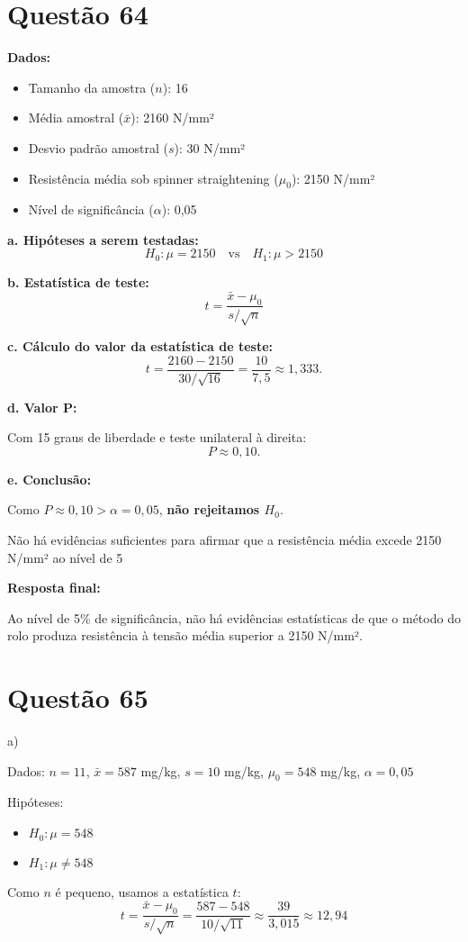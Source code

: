 \documentclass[12pt]{article}
\newcommand{\quest}[1]{\section*{Questão #1}} %
\begin{document}
\quest{64}

\textbf{Dados:}

\begin{itemize}
    \item Tamanho da amostra (\(n\)): 16
    \item Média amostral (\(\bar{x}\)): 2160 N/mm²
    \item Desvio padrão amostral (\(s\)): 30 N/mm²
    \item Resistência média sob spinner straightening (\(\mu_0\)): 2150 N/mm²
    \item Nível de significância (\(\alpha\)): 0,05
\end{itemize}

\textbf{a. Hipóteses a serem testadas:}
\[
H_0: \mu = 2150 
\quad\text{vs}\quad
H_1: \mu > 2150
\]

\textbf{b. Estatística de teste:}
\[
t = \frac{\bar{x} - \mu_0}{s/\sqrt{n}}
\]

\textbf{c. Cálculo do valor da estatística de teste:}
\[
t = \frac{2160 - 2150}{30/\sqrt{16}}
= \frac{10}{7,5}
\approx 1{,}333.
\]

\textbf{d. Valor P:}

Com 15 graus de liberdade e teste unilateral à direita:
\[
P \approx 0{,}10.
\]

\textbf{e. Conclusão:}

Como \(P \approx 0{,}10 > \alpha = 0,05\), \textbf{não rejeitamos \(H_0\)}.

Não há evidências suficientes para afirmar que a resistência média excede 2150 N/mm² ao nível de 5%

\textbf{Resposta final:}

Ao nível de 5\% de significância, não há evidências estatísticas de que o método do rolo produza resistência à tensão média superior a 2150 N/mm².


\quest{65}

a)

Dados: $n = 11$, $\bar{x} = 587$ mg/kg, $s = 10$ mg/kg, $\mu_0 = 548$ mg/kg, $\alpha = 0{,}05$

Hipóteses:
\begin{itemize}
  \item $H_0: \mu = 548$
  \item $H_1: \mu \neq 548$
\end{itemize}

Como $n$ é pequeno, usamos a estatística $t$:
\[
t = \frac{\bar{x} - \mu_0}{s / \sqrt{n}} = \frac{587 - 548}{10 / \sqrt{11}} \approx \frac{39}{3{,}015} \approx 12{,}94
\]
\end{document}

